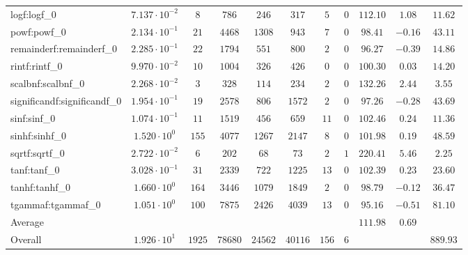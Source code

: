 \begin{tabular}{|l|c|c|c|c|c|c|c|c|c|c|}
logf:logf\_0                 & $ 7.137 \cdot 10^{-2} $ & $ 8      $ & $ 786   $ & $ 246   $ & $ 317   $ & $ 5   $ & $ 0 $ & $ 112.10      $ & $ 1.08    $ & $ 11.62   $ \\
powf:powf\_0                 & $ 2.134 \cdot 10^{-1} $ & $ 21     $ & $ 4468  $ & $ 1308  $ & $ 943   $ & $ 7   $ & $ 0 $ & $ 98.41       $ & $ -0.16   $ & $ 43.11   $ \\
remainderf:remainderf\_0     & $ 2.285 \cdot 10^{-1} $ & $ 22     $ & $ 1794  $ & $ 551   $ & $ 800   $ & $ 2   $ & $ 0 $ & $ 96.27       $ & $ -0.39   $ & $ 14.86   $ \\
rintf:rintf\_0               & $ 9.970 \cdot 10^{-2} $ & $ 10     $ & $ 1004  $ & $ 326   $ & $ 426   $ & $ 0   $ & $ 0 $ & $ 100.30      $ & $ 0.03    $ & $ 14.20   $ \\
scalbnf:scalbnf\_0           & $ 2.268 \cdot 10^{-2} $ & $ 3      $ & $ 328   $ & $ 114   $ & $ 234   $ & $ 2   $ & $ 0 $ & $ 132.26      $ & $ 2.44    $ & $ 3.55    $ \\
significandf:significandf\_0 & $ 1.954 \cdot 10^{-1} $ & $ 19     $ & $ 2578  $ & $ 806   $ & $ 1572  $ & $ 2   $ & $ 0 $ & $ 97.26       $ & $ -0.28   $ & $ 43.69   $ \\
sinf:sinf\_0                 & $ 1.074 \cdot 10^{-1} $ & $ 11     $ & $ 1519  $ & $ 456   $ & $ 659   $ & $ 11  $ & $ 0 $ & $ 102.46      $ & $ 0.24    $ & $ 11.36   $ \\
sinhf:sinhf\_0               & $ 1.520 \cdot 10^{0}  $ & $ 155    $ & $ 4077  $ & $ 1267  $ & $ 2147  $ & $ 8   $ & $ 0 $ & $ 101.98      $ & $ 0.19    $ & $ 48.59   $ \\
sqrtf:sqrtf\_0               & $ 2.722 \cdot 10^{-2} $ & $ 6      $ & $ 202   $ & $ 68    $ & $ 73    $ & $ 2   $ & $ 1 $ & $ 220.41      $ & $ 5.46    $ & $ 2.25    $ \\
tanf:tanf\_0                 & $ 3.028 \cdot 10^{-1} $ & $ 31     $ & $ 2339  $ & $ 722   $ & $ 1225  $ & $ 13  $ & $ 0 $ & $ 102.39      $ & $ 0.23    $ & $ 23.60   $ \\
tanhf:tanhf\_0               & $ 1.660 \cdot 10^{0}  $ & $ 164    $ & $ 3446  $ & $ 1079  $ & $ 1849  $ & $ 2   $ & $ 0 $ & $ 98.79       $ & $ -0.12   $ & $ 36.47   $ \\
tgammaf:tgammaf\_0           & $ 1.051 \cdot 10^{0}  $ & $ 100    $ & $ 7875  $ & $ 2426  $ & $ 4039  $ & $ 13  $ & $ 0 $ & $ 95.16       $ & $ -0.51   $ & $ 81.10   $ \\
\hline
Average                      & $                     $ & $        $ & $       $ & $       $ & $       $ & $     $ & $   $ & $ 111.98      $ & $ 0.69    $ & $         $ \\
\hline
Overall                      & $ 1.926 \cdot 10^{1}  $ & $ 1925   $ & $ 78680 $ & $ 24562 $ & $ 40116 $ & $ 156 $ & $ 6 $ & $             $ & $         $ & $ 889.93  $ \\
\hline
\end{tabular}
